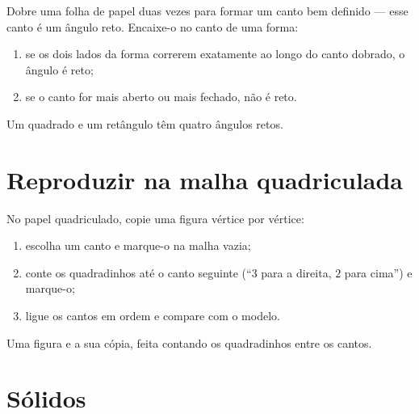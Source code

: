 \begin{method}\label{met:g2:shapes:rightangle}
Dobre uma folha de papel duas vezes para formar um canto bem
definido --- esse canto é um ângulo reto. Encaixe-o no canto de uma
forma:
\begin{enumerate}
  \item se os dois lados da forma correrem exatamente ao longo do
        canto dobrado, o ângulo é reto;
  \item se o canto for mais aberto ou mais fechado, não é reto.
\end{enumerate}
Um quadrado e um retângulo têm quatro ângulos retos.
\end{method}

\section{Reproduzir na malha quadriculada}

\begin{method}\label{met:g2:shapes:copy}
No papel quadriculado, copie uma figura vértice por vértice:
\begin{enumerate}
  \item escolha um canto e marque-o na malha vazia;
  \item conte os quadradinhos até o canto seguinte (``$3$ para a
        direita, $2$ para cima'') e marque-o;
  \item ligue os cantos em ordem e compare com o modelo.
\end{enumerate}
\end{method}

\begin{omfigure}

{\small Uma figura e a sua cópia, feita contando os quadradinhos
entre os cantos.}
\end{omfigure}

\section{Sólidos}

